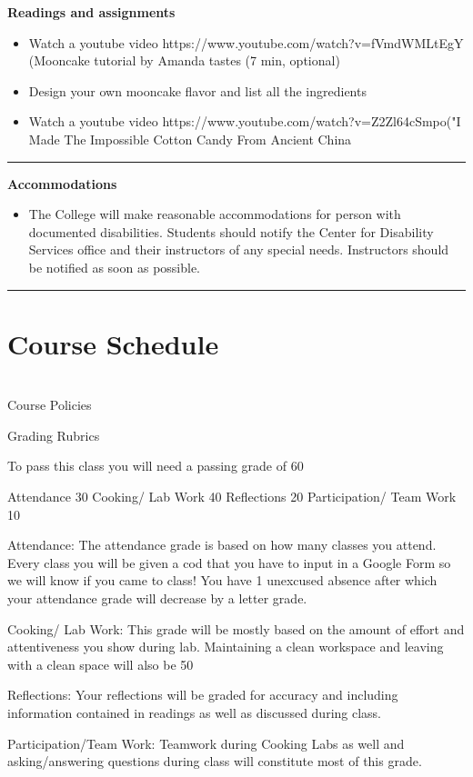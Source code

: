 \documentclass{article}
\begin{document}
\noindent\textbf{Readings and assignments}
\begin{itemize}
\item Watch a youtube video https://www.youtube.com/watch?v=fVmdWMLtEgY (Mooncake tutorial by Amanda tastes (7 min, optional)
\item Design your own mooncake flavor and list all the ingredients 
\item Watch a youtube video https://www.youtube.com/watch?v=Z2Zl64cSmpo("I Made The Impossible Cotton Candy From Ancient China 
\end{itemize}
  \par\noindent\rule{\textwidth}{0.4pt}
\textbf{Accommodations }
\begin{itemize}
\vspace{0.5em} 
\item\noindent The College will make reasonable accommodations for person with documented disabilities. Students should notify the Center for Disability Services office and their instructors of any special needs. Instructors should be notified as soon as possible.

 \end{itemize}
  \par\noindent\rule{\textwidth}{0.4pt}
 \section*{Course Schedule }\\
Course Policies

Grading Rubrics 

To pass this class you will need a passing grade of 60%
   
Attendance
30%
Cooking/ Lab Work
40%
Reflections
20%
Participation/ Team Work
10%
 
Attendance: The attendance grade is based on how many classes you attend. Every class you will be given a cod that you have to input in a Google Form so we will know if you came to class! You have 1 unexcused absence after which  your attendance grade will decrease by a letter grade.

Cooking/ Lab Work: This grade will be mostly based on the amount of effort and attentiveness you show during lab. Maintaining a clean workspace and leaving with a clean space will also be 50%

Reflections: Your reflections will be graded for accuracy and including information contained in readings as well as discussed during class.

Participation/Team Work: Teamwork during Cooking Labs as well and asking/answering questions during class will constitute most of this grade.
\end{document}
